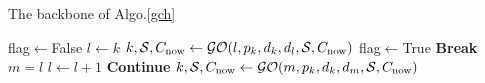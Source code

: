 \documentclass{article}
\begin{document}
\begin{algorithm}[htbp]
	\caption{The backbone of Algo.\ref{gch}}
	\label{gcn}
	\begin{algorithmic}[1]
		\renewcommand{\algorithmiccomment}[1]{\hfill\textit{\textcolor{blue}{\##1}}}
		\STATE flag$\gets$False
		\STATE $l\gets k$
		\STATE $k,\mathcal{S},C_{\mathrm{now}}\gets\mathcal{GO}(l,p_k,d_k,d_l,\mathcal{S},C_{\mathrm{now}})$
		\STATE flag$\gets$True
		\STATE \textbf{Break}
		\ENDIF
		\STATE $m=l$
		\ENDIF
		\STATE $l\gets l+1$
		\ENDFOR
		\STATE \textbf{Continue}
		\ENDIF
		\STATE $k,\mathcal{S},C_{\mathrm{now}}\gets\mathcal{GO}(m,p_k,d_k,d_m,\mathcal{S},C_{\mathrm{now}})$
		\ENDWHILE
	\end{algorithmic} 
\end{algorithm}
\end{document}
